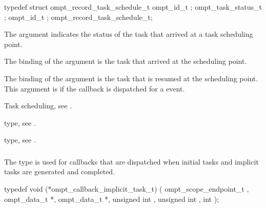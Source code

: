 \record
\begin{ccppspecific}
\begin{omptRecord}
typedef struct ompt_record_task_schedule_t {
  ompt_id_t ;
  ompt_task_status_t ;
  ompt_id_t ;
} ompt_record_task_schedule_t;
\end{omptRecord}
\end{ccppspecific}

\argdesc
The  argument indicates the status of
the task that arrived at a task scheduling point.

The binding of the  argument is the task that
arrived at the scheduling point.

The binding of the  argument is the task that
is resumed at the scheduling point. This argument is  if 
the callback is dispatched for a  event.

\begin{crossrefs}
\item Task scheduling, see .

\item {} type, see .

\item {} type, see .
\end{crossrefs}



\subsubsection{}
\label{sec:ompt_callback_implicit_task_t}

\summary
The  type is used for callbacks that are 
dispatched when initial tasks and implicit tasks are generated and completed.

\format
\begin{ccppspecific}
\begin{omptCallback}
typedef void (*ompt_callback_implicit_task_t) (
  ompt_scope_endpoint_t ,
  ompt_data_t *,
  ompt_data_t *,
  unsigned int ,
  unsigned int ,
  int 
);
\end{omptCallback}
\end{ccppspecific}

